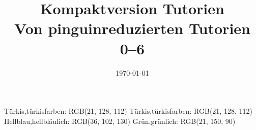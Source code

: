 \def\thpath{./data}
\RequirePackage{color-palettes}
{Türkis,türkisfarben: RGB(21, 128, 112)}
{Türkis,türkisfarben: RGB(21, 128, 112)}
{Hellblau,hellbläulich: RGB(36, 102, 130)}
{Grün,grünlich: RGB(21, 150, 90)}
\def\btdmopts{color=paletteA}%
\def\btdmmode{lightmode-fill}

\usepackage{fmtcount}

%
%
\fullfalse
\def\maxtut{6}
\titlenumber{0--\maxtut}
\title[Alle Tutorien 0--\maxtut]{Kompaktversion Tutorien\\\small Von pinguinreduzierten Tutorien 0--\maxtut}
\date{\sffamily\today}


\let\oldinputif\InputIfFileExists

\makeatletter
\usepackage{pgfcalendar}
\edef\semesterstartyear{2022}
\def\startkwofsemester{16} %
\newcount\@kwconverter
\newcount\@firstweekday
{}
\def\getstartdayofweek#1#2{%
      \ifnum#1<\startkwofsemester \edef\@year{\the\numexpr\semesterstartyear+1}%
      \else\let\@year\semesterstartyear\fi
      \pgfcalendardatetojulian{\@year-1-1}{\@kwconverter}\pgfcalendarjuliantoweekday\@kwconverter\@firstweekday
            \edef\@day{\the\numexpr#1*7-\number\@firstweekday+#2\relax}%
      \pgfcalendardatetojulian{\@year-1-1+\@day}{\@kwconverter}%
      \pgfcalendarjuliantodate{\@kwconverter}\@year\@month\@day
      \DTMdisplaydate\@year\@month\@day\m@ne\relax
}

\def\getKwRange#1{\getstartdayofweek{#1}0\,---\,\getstartdayofweek{#1}6}

